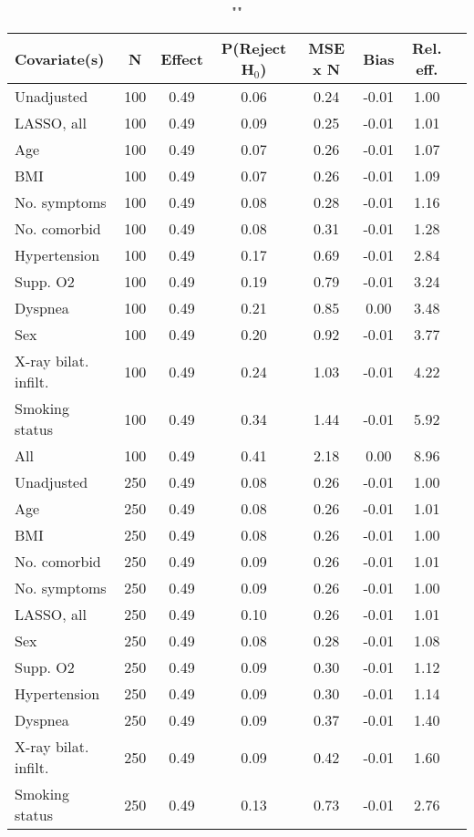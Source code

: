 \documentclass{article}
\begin{document}
{\tabcolsep=6pt  %
\begin{longtable}{lccccccc}
\caption{""} \\
Covariate(s) & N & Effect & P(Reject H$_0$) & MSE x N & Bias & Rel. eff.\\ \midrule
Unadjusted & 100 & 0.49 & 0.06 & 0.24 & -0.01 & 1.00 \\ 
LASSO, all & 100 & 0.49 & 0.09 & 0.25 & -0.01 & 1.01 \\ 
Age & 100 & 0.49 & 0.07 & 0.26 & -0.01 & 1.07 \\ 
BMI & 100 & 0.49 & 0.07 & 0.26 & -0.01 & 1.09 \\ 
No. symptoms & 100 & 0.49 & 0.08 & 0.28 & -0.01 & 1.16 \\ 
No. comorbid & 100 & 0.49 & 0.08 & 0.31 & -0.01 & 1.28 \\ 
Hypertension & 100 & 0.49 & 0.17 & 0.69 & -0.01 & 2.84 \\ 
Supp. O2 & 100 & 0.49 & 0.19 & 0.79 & -0.01 & 3.24 \\ 
Dyspnea & 100 & 0.49 & 0.21 & 0.85 &  0.00 & 3.48 \\ 
Sex & 100 & 0.49 & 0.20 & 0.92 & -0.01 & 3.77 \\ 
X-ray bilat. infilt. & 100 & 0.49 & 0.24 & 1.03 & -0.01 & 4.22 \\ 
Smoking status & 100 & 0.49 & 0.34 & 1.44 & -0.01 & 5.92 \\ 
All & 100 & 0.49 & 0.41 & 2.18 &  0.00 & 8.96 \\ \midrule 
Unadjusted & 250 & 0.49 & 0.08 & 0.26 & -0.01 & 1.00 \\ 
Age & 250 & 0.49 & 0.08 & 0.26 & -0.01 & 1.01 \\ 
BMI & 250 & 0.49 & 0.08 & 0.26 & -0.01 & 1.00 \\ 
No. comorbid & 250 & 0.49 & 0.09 & 0.26 & -0.01 & 1.01 \\ 
No. symptoms & 250 & 0.49 & 0.09 & 0.26 & -0.01 & 1.00 \\ 
LASSO, all & 250 & 0.49 & 0.10 & 0.26 & -0.01 & 1.01 \\ 
Sex & 250 & 0.49 & 0.08 & 0.28 & -0.01 & 1.08 \\ 
Supp. O2 & 250 & 0.49 & 0.09 & 0.30 & -0.01 & 1.12 \\ 
Hypertension & 250 & 0.49 & 0.09 & 0.30 & -0.01 & 1.14 \\ 
Dyspnea & 250 & 0.49 & 0.09 & 0.37 & -0.01 & 1.40 \\ 
X-ray bilat. infilt. & 250 & 0.49 & 0.09 & 0.42 & -0.01 & 1.60 \\ 
Smoking status & 250 & 0.49 & 0.13 & 0.73 & -0.01 & 2.76 \\ 

\end{longtable}}
\end{document}
